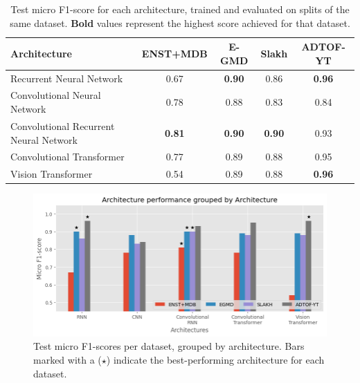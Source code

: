 \begin{table}[H]
    \centering
    \hspace*{-0.6cm}
    \begin{tabular}{l|cccc}
        Architecture & ENST+MDB & E-GMD & Slakh & ADTOF-YT       \\
        \hline
        Recurrent Neural Network	& 0.67 &	\textbf{0.90} &	0.86 &	\textbf{0.96} \\
        Convolutional Neural Network	& 0.78 &	0.88 &	0.83 &	0.84 \\
        Convolutional Recurrent Neural Network	& \textbf{0.81} &	\textbf{0.90} &	\textbf{0.90} &	0.93 \\
        Convolutional Transformer	& 0.77 & 0.89 &	0.88 &	0.95 \\
        Vision Transformer	& 0.54 &	0.89 &	0.88 &	\textbf{0.96} \\
        
    \end{tabular}
    \caption{Test micro F1-score for each architecture, trained and evaluated on splits of the same dataset. \textbf{Bold} values represent the highest score achieved for that dataset.}
    \label{ArchitectureResultsTable}
\end{table}


\begin{figure}[H]
    \centering
    \hspace*{-0.8cm}
    \includegraphics[scale=0.8]{figures/architectureperformancearchitecture.png}
    \caption{Test micro F1-scores per dataset, grouped by architecture. Bars marked with a ($\star$) indicate the best-performing architecture for each dataset.}
    \label{ArchitectureResultsArchitectureFigure}
\end{figure}

